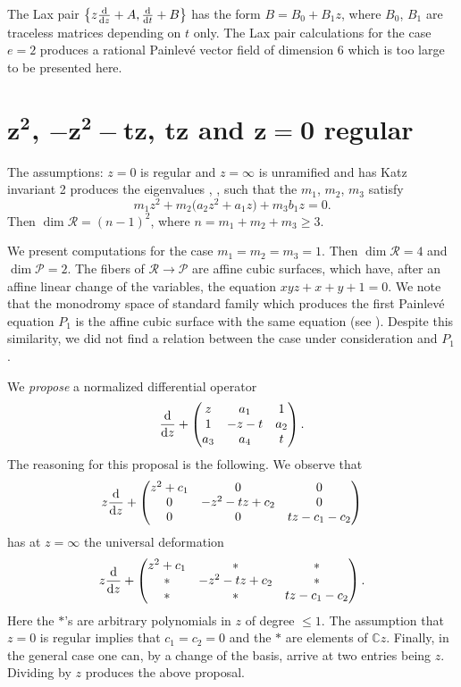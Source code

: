 \documentclass[pdftex]{sigma}
\numberwithin{equation}{section}
\begin{document}
The Lax pair $\bigl\{ z\frac{{\rm d}}{{\rm d}z}+A,\frac{{\rm d}}{{\rm d}t}+B\bigr\}$ has the form $B=B_0+B_1z$, where $B_0$, $B_1$ are traceless matrices depending on $t$ only. The Lax pair calculations for the case $e=2$ produces a rational Painlev\'e vector field of dimension 6 which is too large to be presented here.

\section[z*z, -z*z-tz, tz and z=0 regular]{$\boldsymbol{z^2}$, $\boldsymbol{-z^2-tz}$, $\boldsymbol{tz}$ and $\boldsymbol{z=0}$ regular}\label{nine}

The assumptions: $z=0$ is regular and $z=\infty$ is unramified and has Katz invariant 2 produces the eigenvalues
, ,  such that the $m_1$, $m_2$, $m_3$ satisfy
\[
m_1z^2+m_2\bigl(a_2z^2+a_1z\bigr)+m_3b_1z=0.
\]
 Then $\dim \mathcal{R}=(n-1)^2$, where $n=m_1+m_2+m_3\geq 3$.

 We present computations for the case
$m_1=m_2=m_3=1$. Then $\dim \mathcal{R}=4$ and $\dim \mathcal{P}=2$. The fibers of $\mathcal{R}\rightarrow \mathcal{P}$ are
affine cubic surfaces, which have, after an affine linear change of the variables, the equation $xyz+x+y+1=0$.
We note that the monodromy space of standard family which produces the first Painlev\'e equation $P_1$ is the affine cubic surface with the same equation (see \cite[Section~3.10]{vdP-Sa}). Despite this similarity, we did not find a relation between the case under consideration and $P_1$.


We {\it propose} a normalized differential operator
\[ \frac{{\rm d}}{{\rm d}z}+ \begin{pmatrix} z &a_1 &1 \\ 1&-z-t &a_2 \\ a_3& a_4& t \end{pmatrix}.\]
The reasoning for this proposal is the following. We observe that
\[z\frac{{\rm d}}{{\rm d}z}+ \begin{pmatrix} z^2+c_1 &0 &0 \\ 0&-z^2-tz+c_2 &0 \\ 0& 0& tz-c_1-c_2 \end{pmatrix}\] has at $z=\infty$ the universal deformation
\[z\frac{{\rm d}}{{\rm d}z}+ \begin{pmatrix} z^2+c_1 &* &* \\ *&-z^2-tz+c_2 &* \\ *& *& tz-c_1-c_2 \end{pmatrix}.\]
Here the $*$'s are arbitrary polynomials in $z$ of degree $\leq 1$. The assumption that $z=0$ is regular implies that
$c_1=c_2=0$ and the $*$ are elements of $\mathbb{C}z$. Finally, in the general case one can, by a change of the basis,
 arrive at two entries being $z$. Dividing by $z$ produces the above proposal.
\end{document}
